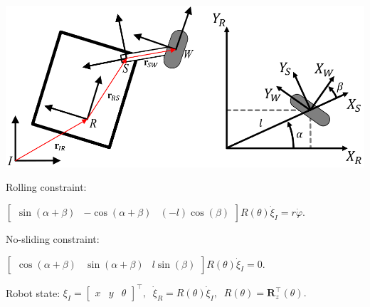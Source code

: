 \documentclass[landscape]{article}
\newcommand{\vmspace}{\vspace{-7pt}}
\newcommand{\vpspace}{\vspace{5pt}}
\begin{document}
\begin{multicols}{3}
\vspace{3pt}

\begin{minipage}{\columnwidth}
  \includegraphics[width=\columnwidth]{img/3_WheelEquations.png}
\end{minipage}

\vspace{5pt}

\begin{minipage}{\columnwidth}
  Rolling constraint:
  \vmspace
  \begin{center}
    $\left[\begin{matrix}
      \sin(\alpha + \beta) & -\cos(\alpha + \beta) & (-l) \cos(\beta)
    \end{matrix}\right]
    R(\theta)\dot\xi_I
    =
    r \dot \varphi.$
  \end{center}
\end{minipage}

\begin{minipage}{\columnwidth}
  No-sliding constraint:
  \vmspace
  \begin{center}
    $\left[\begin{matrix}
      \cos(\alpha + \beta) & \sin(\alpha + \beta) & l \sin(\beta)
    \end{matrix}\right]
    R(\theta)\dot\xi_I
    =
    0.$
  \end{center}
\end{minipage}

\begin{minipage}{\columnwidth}
  Robot state:
    $\xi_I
    =
    \left[\begin{matrix}
      x & y & \theta
    \end{matrix}\right]^\intercal,
    \;\;
    \dot\xi_R = R(\theta)\dot\xi_I,
    \;\;
    R(\theta) = \mathbf R_z^\intercal(\theta).$
\end{minipage}

\vpspace


\end{multicols}
\end{document}
